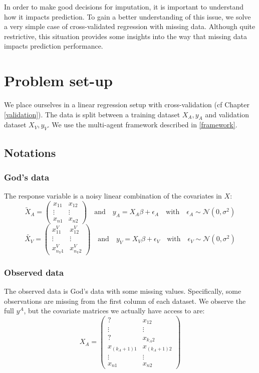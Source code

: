 In order to make good decisions for imputation, it is important to understand how it impacts prediction. To gain a better understanding of this issue, we solve a very simple case of cross-validated regression with missing data. Although quite restrictive, this situation provides some insights into the way that missing data impacts prediction performance.

	\section{Problem set-up}
We place ourselves in a linear regression setup with cross-validation (cf Chapter \ref{validation}). The data is split between a training dataset $X_A, y_A$ and validation dataset $X_V, y_V$. We use the multi-agent framework described in \ref{framework}.
		\subsection{Notations}
			\subsubsection{God's data}
The response variable is a noisy linear combination of the covariates in $X$:
\begin{equation*}
\tilde{X}_A = 
\begin{pmatrix}
x_{11} & x_{12} \\
\vdots & \vdots \\
x_{n1} & x_{n2}
\end{pmatrix}
\quad \mathrm{and} \quad
y_A = X_A \beta + \epsilon_A
\quad \mathrm{with} \quad
\epsilon_A \sim \mathcal{N}(0, \sigma^2)
\end{equation*}
\begin{equation*}
\tilde{X_V} = 
\begin{pmatrix}
x_{11}^V & x_{12}^V \\
\vdots & \vdots \\
x_{n_V1}^V & x_{n_V2}^V
\end{pmatrix}
\quad \mathrm{and} \quad
y_V = X_V \beta + \epsilon_V
\quad \mathrm{with} \quad
\epsilon_V \sim \mathcal{N}(0, \sigma^2)
\end{equation*}


			\subsubsection{Observed data}
The observed data is God's data with some missing values. Specifically, some observations are missing from the first column of each dataset.  We observe the full $y^A$, but the covariate matrices we actually have access to are:
\begin{equation*}
X_A = 
\begin{pmatrix}
? & x_{12} \\
\vdots & \vdots \\
? & x_{k_A2} \\
x_{(k_A+1)1} & x_{(k_A+1)2}\\
\vdots & \vdots \\
x_{n1} & x_{n2}
\end{pmatrix}
\end{equation*}

